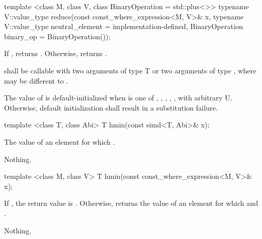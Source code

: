 \begin{itemdecl}
template <class M, class V, class BinaryOperation = std::plus<>>
typename V::value_type reduce(const const_where_expression<M, V>& x,
                              typename V::value_type neutral_element = implementation-defined,
                              BinaryOperation binary_op = BinaryOperation());
\end{itemdecl}
\begin{itemdescr}
  \pnum\returns
  If , returns .
  Otherwise, returns  .

  \pnum\requires {} shall be callable with two arguments of type \type T or two arguments of type \simd[<T, A1>], where  may be different to .

  \pnum\requires The value of  is default-initialized when  is one of , , , , , with arbitrary \type U.
  Otherwise, default initialization shall result in a substitution failure.

  \pnum{}
\end{itemdescr}

\begin{itemdecl}
template <class T, class Abi> T hmin(const simd<T, Abi>& x);
\end{itemdecl}
\begin{itemdescr}
  \pnum\returns The value of an element  for which  \foralli.

  \pnum\throws Nothing.
\end{itemdescr}

\begin{itemdecl}
template <class M, class V> T hmin(const const_where_expression<M, V>& x);
\end{itemdecl}
\begin{itemdescr}
  \pnum\returns If , the return value is .
  Otherwise, returns the value of an element  for which  and  \foralli.

  \pnum\throws Nothing.
\end{itemdescr}

